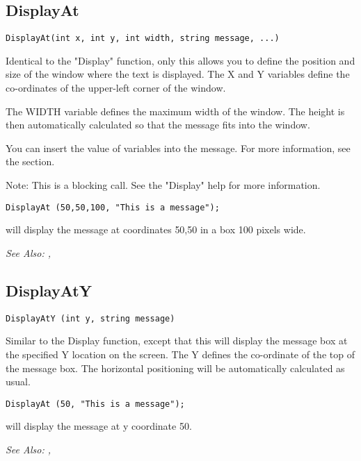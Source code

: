 \subsection{DisplayAt}\label{DisplayAt}%

\begin{verbatim}
DisplayAt(int x, int y, int width, string message, ...)

\end{verbatim}
Identical to the "Display" function, only this allows you to define the
position and size of the window where the text is displayed. The X and Y
variables define the co-ordinates of the upper-left corner of the window.

The WIDTH variable defines the maximum width of the window. The height is then
automatically calculated so that the message fits into the window.

You can insert the value of variables into the message. For more information,
see the  section.

Note: This is a blocking call. See the "Display" help for more information.

\begin{verbatim}
DisplayAt (50,50,100, "This is a message");
\end{verbatim}
will display the message at coordinates 50,50 in a box 100 pixels wide.

\it{See Also:} , 

\subsection{DisplayAtY}\label{DisplayAtY}%

\begin{verbatim}
DisplayAtY (int y, string message)
\end{verbatim}
Similar to the Display function, except that this will display the message
box at the specified Y location on the screen. The Y defines the co-ordinate
of the top of the message box. The horizontal positioning will be
automatically calculated as usual.

\begin{verbatim}
DisplayAt (50, "This is a message");
\end{verbatim}
will display the message at y coordinate 50.

\it{See Also:} , 

